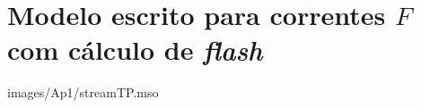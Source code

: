 %
%
%
\chapter{Modelo escrito para correntes $F$ com cálculo de
\textit{flash}}
\label{chap:streamTP}

 {images/Ap1/streamTP.mso}

